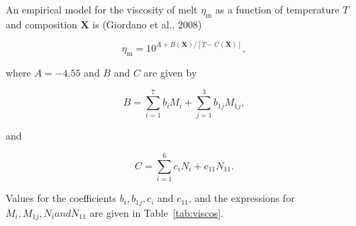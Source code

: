 \documentclass[]{book}
\theoremstyle{definition}
\begin{document}
\begin{enumerate}
  An empirical model for the viscosity of melt $\eta_{\text{m}}$ as a function of temperature $T$ and composition $\mathbf{X}$ is (Giordano et al., 2008)
  
  \begin{equation}
    \label{equ:Giordano}
    \eta_{\text{m}} = 10 ^{A + B(\mathbf{X})/[T - C(\mathbf{X})]},
  \end{equation}

  where $A = -4.55$ and $B$ and $C$ are given by

  \begin{equation}
    \label{equ:Giordano_B}
    B = \sum_{i = 1}^{7} b_{i} M_{i} + \sum_{j = 1}^{3} b_{1j} M_{1j},
  \end{equation}

  and
  
  \begin{equation}
    \label{equ:Giordano_C}
    C = \sum_{i = 1}^{6} c_{i} N_{i} + c_{11} N_{11}.
  \end{equation}

  Values for the coefficients $b_{i}, b_{1j}, c_{i}$ and $c_{11}$, and the expressions for $M_{i}, M_{1j}, N_{i} and N_{11}$ are given in Table~\ref{tab:viscos}.


\end{enumerate}
\end{document}

